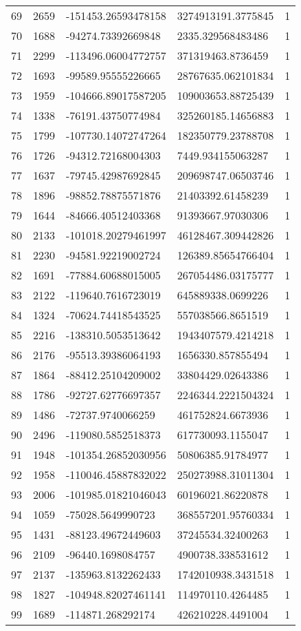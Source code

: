\begin{longtable}{lllll}
    69 & 2659 & -151453.26593478158 & 3274913191.3775845 & 1 \\
    70 & 1688 & -94274.73392669848 & 2335.329568483486 & 1 \\
    71 & 2299 & -113496.06004772757 & 371319463.8736459 & 1 \\
    72 & 1693 & -99589.95555226665 & 28767635.062101834 & 1 \\
    73 & 1959 & -104666.89017587205 & 109003653.88725439 & 1 \\
    74 & 1338 & -76191.43750774984 & 325260185.14656883 & 1 \\
    75 & 1799 & -107730.14072747264 & 182350779.23788708 & 1 \\
    76 & 1726 & -94312.72168004303 & 7449.934155063287 & 1 \\
    77 & 1637 & -79745.42987692845 & 209698747.06503746 & 1 \\
    78 & 1896 & -98852.78875571876 & 21403392.61458239 & 1 \\
    79 & 1644 & -84666.40512403368 & 91393667.97030306 & 1 \\
    80 & 2133 & -101018.20279461997 & 46128467.309442826 & 1 \\
    81 & 2230 & -94581.92219002724 & 126389.85654766404 & 1 \\
    82 & 1691 & -77884.60688015005 & 267054486.03175777 & 1 \\
    83 & 2122 & -119640.7616723019 & 645889338.0699226 & 1 \\
    84 & 1324 & -70624.74418543525 & 557038566.8651519 & 1 \\
    85 & 2216 & -138310.5053513642 & 1943407579.4214218 & 1 \\
    86 & 2176 & -95513.39386064193 & 1656330.857855494 & 1 \\
    87 & 1864 & -88412.25104209002 & 33804429.02643386 & 1 \\
    88 & 1786 & -92727.62776697357 & 2246344.2221504324 & 1 \\
    89 & 1486 & -72737.9740066259 & 461752824.6673936 & 1 \\
    90 & 2496 & -119080.5852518373 & 617730093.1155047 & 1 \\
    91 & 1948 & -101354.26852030956 & 50806385.91784977 & 1 \\
    92 & 1958 & -110046.45887832022 & 250273988.31011304 & 1 \\
    93 & 2006 & -101985.01821046043 & 60196021.86220878 & 1 \\
    94 & 1059 & -75028.5649990723 & 368557201.95760334 & 1 \\
    95 & 1431 & -88123.49672449603 & 37245534.32400263 & 1 \\
    96 & 2109 & -96440.1698084757 & 4900738.338531612 & 1 \\
    97 & 2137 & -135963.8132262433 & 1742010938.3431518 & 1 \\
    98 & 1827 & -104948.82027461141 & 114970110.4264485 & 1 \\
    99 & 1689 & -114871.268292174 & 426210228.4491004 & 1
\end{longtable}